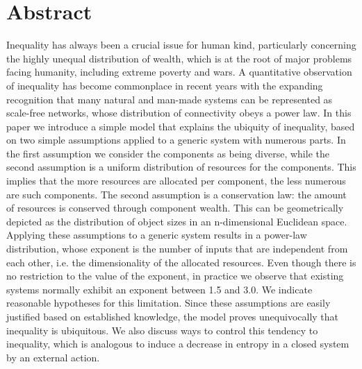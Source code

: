 \documentclass[10pt,letterpaper]{article}
\begin{document}
\section*{Abstract}
Inequality has always been a crucial issue for human kind,
particularly concerning the highly unequal distribution of wealth,
which is at the root of major problems facing humanity, including extreme poverty and wars.
A quantitative observation of inequality has become commonplace in recent years
with the expanding recognition that many natural and man-made systems can be represented as scale-free networks,
whose distribution of connectivity obeys a power law.
In this paper we introduce a simple model that explains the ubiquity of inequality,
based on two simple assumptions applied to a generic system with numerous parts.
In the first assumption we consider the components as being diverse, while the
second assumption is a uniform distribution of resources for the components.
This implies that the more resources are allocated per component, the less numerous are such components.
The second assumption is a conservation law: the amount of resources is conserved through component wealth.
This can be geometrically depicted as the distribution of object sizes in an n-dimensional Euclidean space.
Applying these assumptions to a generic system results in a power-law distribution,
whose exponent is the number of inputs that are independent from each other,
i.e. the dimensionality of the allocated resources.
Even though there is no restriction to the value of the exponent,
in practice we observe that existing systems normally exhibit an exponent between 1.5 and 3.0.
We indicate reasonable hypotheses for this limitation.
Since these assumptions are easily justified based on established knowledge,
the model proves unequivocally that inequality is ubiquitous.
We also discuss ways to control this tendency to inequality,
which is analogous to induce a decrease in entropy in a closed system by an external action.
\end{document}
